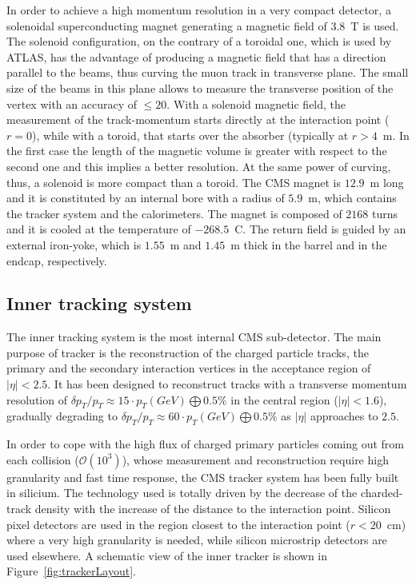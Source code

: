 In order to achieve a high momentum resolution in a very compact detector,
a solenoidal superconducting magnet generating a magnetic field of 3.8~\si{\tesla} is used. 
The solenoid configuration, on the contrary of a toroidal one, which is used by ATLAS,
has the advantage of producing a magnetic field that has a direction 
parallel to the beams, thus curving the muon track in transverse plane. 
The small size of the beams in this plane allows to measure the transverse 
position of the vertex with an accuracy of $\le20$\si{\mum}. 
With a solenoid magnetic field, the measurement of the track-momentum starts directly 
at the interaction point ($r=0$), while with a toroid, that starts over the absorber (typically at $r>4$~\si{\metre}.
In the first case the length of the magnetic volume is greater with respect
to the second one and this implies a better resolution. 
At the same power of curving, thus, a solenoid is more compact than a toroid.
The CMS magnet is $12.9$~\si{\metre} long and it is constituted by an internal bore
with a radius of $5.9$~\si{\metre}, which contains the tracker system and
the calorimeters. The magnet is composed of $2168$ turns and it is cooled
at the temperature of $-268.5$~\textdegree C. The return field is guided
by an external iron-yoke, which is $1.55$~\si{\metre} and $1.45$~\si{\metre} thick
in the barrel and in the endcap, respectively.

\subsection{Inner tracking system}
\label{subsec:tracker}

The inner tracking system is the most internal CMS sub-detector.
The main purpose of tracker is the reconstruction of 
the charged particle tracks, the primary and the secondary interaction vertices 
in the acceptance region of $|\eta|<2.5$. 
It has been designed to reconstruct tracks with a transverse momentum resolution
of $\delta p_T/p_T \approx 15\cdot p_T(GeV)\bigoplus 0.5\%$ in the central region
($|\eta|<1.6$), gradually degrading to $\delta p_T/p_T \approx 60\cdot p_T(GeV)\bigoplus 0.5\%$ 
as $|\eta|$ approaches to $2.5$. 


In order to cope with the high flux of charged primary particles coming out from each collision
($\mathcal{O}(10^3)$), whose measurement and reconstruction require high granularity and
fast time response, the CMS tracker system has been fully built in silicium.
The technology used is totally driven by the decrease of the charded-track density 
with the increase of the distance to the interaction point. Silicon pixel detectors are used 
in the region closest to the interaction point ($r<20$~\si{cm})
where a very high granularity is needed, while silicon microstrip detectors are used elsewhere.
A schematic view of the inner tracker is shown in Figure~\ref{fig:trackerLayout}.

